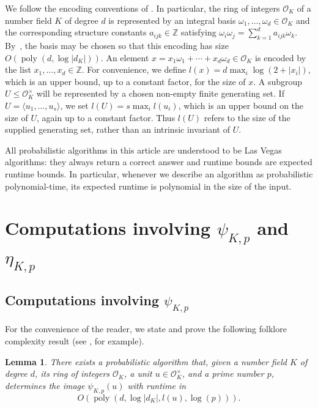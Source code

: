 \documentclass[12pt, a4paper, usenames]{amsart}
\newcommand{\Z}{\mathbb{Z}}
\theoremstyle{plain}
\newtheorem{lemma}[theorem]{Lemma}
\theoremstyle{remark}
\theoremstyle{definition}
\DeclareMathOperator{\poly}{poly}
\begin{document}
We follow the encoding conventions of \cite{MR1129315}.
In particular, the ring of integers $\mathcal{O}_K$ of a number field $K$ of degree $d$ is represented by an 
integral basis $\omega_1,\dotsc,\omega_d \in \mathcal{O}_K$
and the corresponding structure constants $a_{ijk} \in \Z$ satisfying $\omega_i \omega_j = \sum_{k=1}^{d} a_{ijk} \omega_k$.
By~\cite[\S 2.10]{MR1129315}, the basis may be chosen 
so that this encoding has size 
$O(\poly(d, \log\lvert d_K\rvert))$.
An element 
$x = x_{1} \omega_{1} + \dotsb + x_{d} \omega_{d} \in \mathcal{O}_{K}$ is encoded by the list 
$x_1,\dotsc,x_d \in \Z$. 
For convenience, we define $l(x) = d \max_i \log (2 + \lvert x_i\rvert)$, which is an upper bound,
up to a constant factor, for the size of $x$.
A subgroup $U \leq \mathcal{O}_K^{\times}$ will be represented by a chosen non-empty finite generating set. 
If $U = \langle u_1,\dots,u_s\rangle$, we set $l(U) = s \max_{i} l(u_i)$, which is an upper bound on the size of $U$, again up to a constant factor. 
Thus $l(U)$ refers to the size of the supplied generating set, rather than an intrinsic invariant of $U$.

All probabilistic algorithms in this article are understood to be Las Vegas algorithms: they always return a correct answer and runtime bounds are expected runtime bounds. In particular, whenever we describe an algorithm as probabilistic polynomial-time, its expected runtime is polynomial in the size of the input.

\section{Computations involving $\psi_{K,p}$ and $\eta_{K,p}$}\label{sec:comp-maps}

\subsection{Computations involving $\psi_{K,p}$}\label{subsec:compute-psi}
For the convenience of the reader, 
we state and prove the following folklore complexity result 
(see \cite[\S 6.2.3]{zbMATH07854947}, for example).

\begin{lemma}\label{lem:schirokauer-element-runtime}
There exists a probabilistic algorithm that, given a number field $K$ of degree $d$, 
its ring of integers $\mathcal{O}_{K}$, 
a unit $u \in \mathcal{O}_{K}^{\times}$, and a prime number $p$,
determines the image $\psi_{K,p}(u)$ with runtime in 
\[ O(\poly(d, \log\lvert  d_K \rvert, l(u), \log(p))). \] 
\end{lemma}
\end{document}
